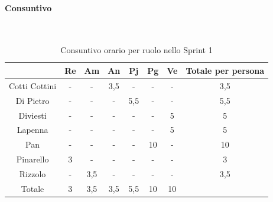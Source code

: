 \documentclass{article}
\begin{document}
                \paragraph{Consuntivo}\mbox{}\\
                \begin{table}[H]
                    \centering
                    \begin{tabular}{|c|c|c|c|c|c|c|c|}
                    \hline
                                  & Re  & Am  & An  & Pj  & Pg  & Ve  & Totale per persona \\ \hline
                    Cotti Cottini & -   & -   & 3,5 & -   & -   & -   & 3,5                \\ \hline
                    Di Pietro     & -   & -   & -   & 5,5 & -   & -   & 5,5                \\ \hline
                    Diviesti      & -   & -   & -   & -   & -   & 5   & 5                  \\ \hline
                    Lapenna       & -   & -   & -   & -   & -   & 5   & 5                  \\ \hline
                    Pan           & -   & -   & -   & -   & 10  & -   & 10                 \\ \hline
                    Pinarello     & 3   & -   & -   & -   & -   & -   & 3                  \\ \hline
                    Rizzolo       & -   & 3,5 & -   & -   & -   & -   & 3,5                \\ \hline
                    Totale        & 3   & 3,5 & 3,5 & 5,5 & 10  & 10  &                    \\ \hline
                    \end{tabular}
                    \caption{Consuntivo orario per ruolo nello Sprint 1}
                \end{table}

\end{document}
